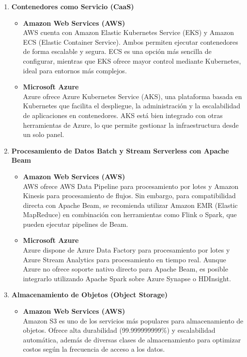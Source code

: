 \documentclass[12pt]{article}
\begin{document}
\begin{enumerate}[label=\arabic*.]
		\item \textbf{Contenedores como Servicio (CaaS)}
		\begin{itemize}
			\item \textbf{Amazon Web Services (AWS)} \\
			AWS cuenta con Amazon Elastic Kubernetes Service (EKS) y Amazon ECS (Elastic Container Service). Ambos permiten ejecutar contenedores de forma escalable y segura. ECS es una opción más sencilla de configurar, mientras que EKS ofrece mayor control mediante Kubernetes, ideal para entornos más complejos.
			
			\item \textbf{Microsoft Azure} \\
			Azure ofrece Azure Kubernetes Service (AKS), una plataforma basada en Kubernetes que facilita el despliegue, la administración y la escalabilidad de aplicaciones en contenedores. AKS está bien integrado con otras herramientas de Azure, lo que permite gestionar la infraestructura desde un solo panel.
		\end{itemize}
		
		\item \textbf{Procesamiento de Datos Batch y Stream Serverless con Apache Beam}
		\begin{itemize}
			\item \textbf{Amazon Web Services (AWS)} \\
			AWS ofrece AWS Data Pipeline para procesamiento por lotes y Amazon Kinesis para procesamiento de flujos. Sin embargo, para compatibilidad directa con Apache Beam, se recomienda utilizar Amazon EMR (Elastic MapReduce) en combinación con herramientas como Flink o Spark, que pueden ejecutar pipelines de Beam.
			
			\item \textbf{Microsoft Azure} \\
			Azure dispone de Azure Data Factory para procesamiento por lotes y Azure Stream Analytics para procesamiento en tiempo real. Aunque Azure no ofrece soporte nativo directo para Apache Beam, es posible integrarlo utilizando Apache Spark sobre Azure Synapse o HDInsight.
		\end{itemize}
		
		\item \textbf{Almacenamiento de Objetos (Object Storage)}
		\begin{itemize}
			\item \textbf{Amazon Web Services (AWS)} \\
			Amazon S3 es uno de los servicios más populares para almacenamiento de objetos. Ofrece alta durabilidad (99.999999999\%) y escalabilidad automática, además de diversas clases de almacenamiento para optimizar costos según la frecuencia de acceso a los datos.
			

\end{itemize}
\end{enumerate}
\end{document}
